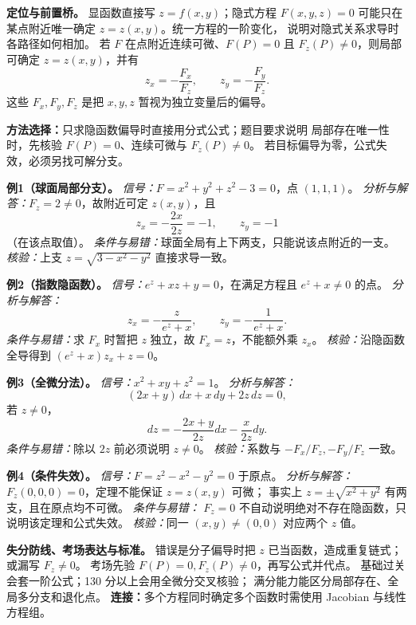\begin{knowledgeBox}
\textbf{定位与前置桥。}
显函数直接写 \(z=f(x,y)\)；隐式方程 \(F(x,y,z)=0\) 可能只在某点附近唯一确定
\(z=z(x,y)\)。统一方程的一阶变化，
说明对隐式关系求导时各路径如何相加。
若 \(F\) 在点附近连续可微、\(F(P)=0\) 且 \(F_z(P)\ne0\)，则局部可确定
\(z=z(x,y)\)，并有
\[
z_x=-\frac{F_x}{F_z},\qquad z_y=-\frac{F_y}{F_z}.
\]
这些 \(F_x,F_y,F_z\) 是把 \(x,y,z\) 暂视为独立变量后的偏导。

\textbf{方法选择：}只求隐函数偏导时直接用分式公式；题目要求说明
局部存在唯一性时，先核验 \(F(P)=0\)、连续可微与 \(F_z(P)\ne0\)。
若目标偏导为零，公式失效，必须另找可解分支。

\textbf{例1（球面局部分支）。}
\emph{信号：}\(F=x^2+y^2+z^2-3=0\)，点 \((1,1,1)\)。
\emph{分析与解答：}\(F_z=2\ne0\)，故附近可定 \(z(x,y)\)，且
\[
z_x=-\frac{2x}{2z}=-1,\qquad z_y=-1
\]
（在该点取值）。
\emph{条件与易错：}球面全局有上下两支，只能说该点附近的一支。
\emph{核验：}上支 \(z=\sqrt{3-x^2-y^2}\) 直接求导一致。

\textbf{例2（指数隐函数）。}
\emph{信号：}\(e^z+xz+y=0\)，在满足方程且 \(e^z+x\ne0\) 的点。
\emph{分析与解答：}
\[
z_x=-\frac{z}{e^z+x},\qquad
z_y=-\frac1{e^z+x}.
\]
\emph{条件与易错：}求 \(F_x\) 时暂把 \(z\) 独立，故 \(F_x=z\)，不能额外乘 \(z_x\)。
\emph{核验：}沿隐函数全导得到
\((e^z+x)z_x+z=0\)。

\textbf{例3（全微分法）。}
\emph{信号：}\(x^2+xy+z^2=1\)。
\emph{分析与解答：}
\[
(2x+y)\,dx+x\,dy+2z\,dz=0,
\]
若 \(z\ne0\)，
\[
dz=-\frac{2x+y}{2z}dx-\frac{x}{2z}dy.
\]
\emph{条件与易错：}除以 \(2z\) 前必须说明 \(z\ne0\)。
\emph{核验：}系数与 \(-F_x/F_z,-F_y/F_z\) 一致。

\textbf{例4（条件失效）。}
\emph{信号：}\(F=z^2-x^2-y^2=0\) 于原点。
\emph{分析与解答：}\(F_z(0,0,0)=0\)，定理不能保证 \(z=z(x,y)\) 可微；
事实上 \(z=\pm\sqrt{x^2+y^2}\) 有两支，且在原点均不可微。
\emph{条件与易错：} \(F_z=0\) 不自动说明绝对不存在隐函数，只说明该定理和公式失效。
\emph{核验：}同一 \((x,y)\ne(0,0)\) 对应两个 \(z\) 值。

\textbf{失分防线、考场表达与标准。}
错误是分子偏导时把 \(z\) 已当函数，造成重复链式；或漏写 \(F_z\ne0\)。
考场先验 \(F(P)=0,F_z(P)\ne0\)，再写公式并代点。
基础过关会套一阶公式；130 分以上会用全微分交叉核验；
满分能力能区分局部存在、全局多分支和退化点。
\textbf{连接：}多个方程同时确定多个函数时需使用 Jacobian 与线性方程组。
\end{knowledgeBox}

